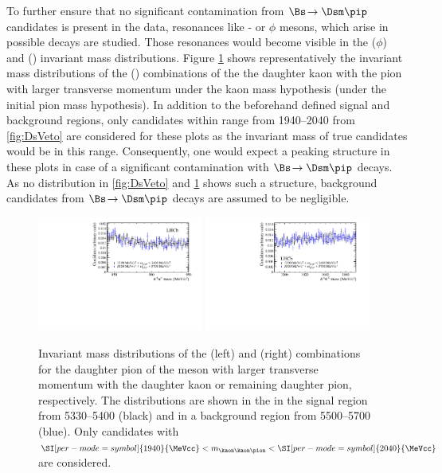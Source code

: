 To further ensure that no significant contamination from $\Bs\!\to\Dsm\pip$ candidates is present in the data, resonances like \Kstarz- or $\phi$ mesons, which arise in possible \Dsm decays are studied.
Those resonances would become visible in the \kaon\kaon ($\phi$) and \kaon\pion (\Kstarz) invariant mass distributions.
Figure \ref{fig:phi_Kst_veto} shows representatively the invariant mass distributions of the \kaon\kaon (\kaon\pion) combinations of the the daughter kaon with the
pion with larger transverse momentum under the kaon mass hypothesis (under the initial pion mass hypothesis).
In addition to the beforehand defined signal and background regions, only candidates within \a range from \SIrange[per-mode=symbol]{1940}{2040}{\MeVcc} from \cref{fig:DsVeto} are considered for these plots as the invariant mass of true \Ds candidates would be in this range.
Consequently, one would expect a peaking structure in these plots in case of a significant contamination with $\Bs\!\to\Dsm\pip$ decays.
As no distribution in \cref{fig:DsVeto} and \cref{fig:phi_Kst_veto} shows such a structure, background candidates from $\Bs\!\to\Dsm\pip$ decays are assumed to be negligible.
\begin{figure}[tbp]
    \centering
    \includegraphics[width=0.485\textwidth]{06selection/figs/KstarHypo2.pdf}
    \includegraphics[width=0.485\textwidth]{06selection/figs/PhiHypo2.pdf}
    \caption{Invariant mass distributions of the \kaon\pion (left) and \kaon\kaon (right) combinations for the daughter pion of the \Dm meson with larger transverse momentum with the daughter kaon or remaining daughter pion, respectively.
    The distributions are shown in the in the \Bs signal region from \SIrange[per-mode=symbol]{5330}{5400}{\MeVcc} (black) and in a background region from \SIrange[per-mode=symbol]{5500}{5700}{\MeVcc} (blue).
    Only candidates with $\SI[per-mode=symbol]{1940}{\MeVcc}<m_{\kaon\kaon\pion}<\SI[per-mode=symbol]{2040}{\MeVcc}$ are considered.}
    \label{fig:phi_Kst_veto}
\end{figure}

